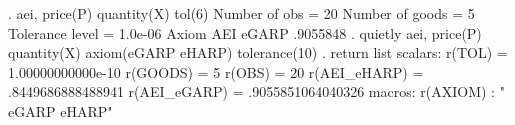 . aei, price(P) quantity(X) tol(6)
{\smallskip}
    Number of obs           =         20 
    Number of goods         =          5 
    Tolerance level         =    1.0e-06 
{\smallskip}
       Axiom {\VBAR}       AEI 
       eGARP {\VBAR}  .9055848 
{\smallskip}
. quietly aei, price(P) quantity(X) axiom(eGARP eHARP) tolerance(10)
{\smallskip}
. return list
{\smallskip}
scalars:
                r(TOL) =  1.00000000000e-10
              r(GOODS) =  5
                r(OBS) =  20
          r(AEI_eHARP) =  .8449686888488941
          r(AEI_eGARP) =  .9055851064040326
{\smallskip}
macros:
              r(AXIOM) : " eGARP eHARP"
